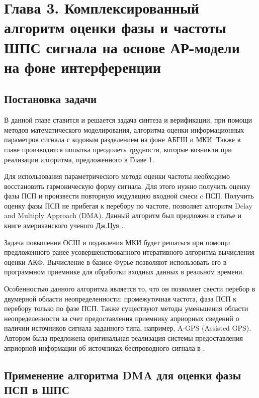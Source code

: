 \setcounter{chapter}{3}
\setcounter{section}{0}
\setcounter{equation}{0}
\setcounter{figure}{0}
\chapter*{Глава 3. Комплексированный алгоритм оценки фазы и частоты ШПС сигнала на основе АР-модели на фоне интерференции}
\section{Постановка задачи}
В данной главе ставится и решается задача синтеза и верификации, при помощи методов математического моделирования, алгоритма оценки информационных параметров
сигнала с кодовым разделением на фоне АБГШ и МКИ. Также в главе производится попытка преодолеть трудности, которые возникли при реализации алгоритма,
предложенного в Главе 1.

Для использования параметрического метода оценки частоты необходимо восстановить гармоническую форму сигнала. Для этого
нужно получить оценку фазы ПСП и произвести повторную модуляцию входной смеси c ПСП. Получить оценку фазы ПСП не прибегая к перебору по частоте,
позволяет алгоритм Delay and Multiply Approach (DMA). Данный алгоритм был предложен в статье и книге американского ученого Дж.Цуя \cite{lin_dma, tsui}.

Задача повышения ОСШ и подавления МКИ будет решаться при помощи предложенного ранее усовершенствованного итеративного алгоритма вычисления оценки АКФ.
Вычисление в базисе Фурье позволяют использовать его в программном приемнике для обработки входных данных в реальном времени.

Особенностью данного алгоритма является то, что он позволяет свести перебор в двумерной области неопределенности:
промежуточная частота, фаза ПСП к перебору только по фазе ПСП. Также существуют методы уменьшения области неопределенности за счет предоставления
приемнику априорных сведений о наличии источников сигнала заданного типа, например, A-GPS (Assisted GPS). Автором была предложена оригинальная
реализация системы предоставления априорной информации об источниках беспроводного сигнала в \cite{nikiforov-patent}.

\section{Применение алгоритма DMA для оценки фазы ПСП в ШПС}
\label{sec_dma_real}


